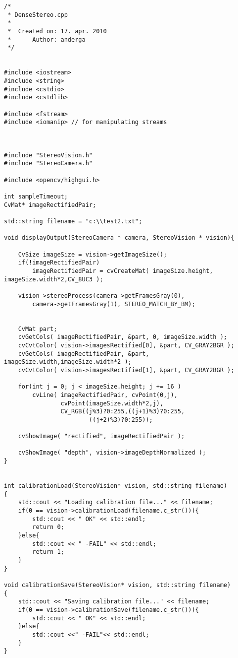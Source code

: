 \begin{lstlisting}
/*
 * DenseStereo.cpp
 *
 *  Created on: 17. apr. 2010
 *      Author: anderga
 */


#include <iostream>
#include <string>
#include <cstdio>
#include <cstdlib>

#include <fstream>
#include <iomanip> // for manipulating streams



#include "StereoVision.h"
#include "StereoCamera.h"

#include <opencv/highgui.h>

int sampleTimeout;
CvMat* imageRectifiedPair;

std::string filename = "c:\\test2.txt";

void displayOutput(StereoCamera * camera, StereoVision * vision){

    CvSize imageSize = vision->getImageSize();
    if(!imageRectifiedPair)
    	imageRectifiedPair = cvCreateMat( imageSize.height, imageSize.width*2,CV_8UC3 );

    vision->stereoProcess(camera->getFramesGray(0), 
        camera->getFramesGray(1), STEREO_MATCH_BY_BM);
    
    
    CvMat part;
    cvGetCols( imageRectifiedPair, &part, 0, imageSize.width );
    cvCvtColor( vision->imagesRectified[0], &part, CV_GRAY2BGR );
    cvGetCols( imageRectifiedPair, &part, imageSize.width,imageSize.width*2 );
    cvCvtColor( vision->imagesRectified[1], &part, CV_GRAY2BGR );

    for(int j = 0; j < imageSize.height; j += 16 )
    	cvLine( imageRectifiedPair, cvPoint(0,j),
    			cvPoint(imageSize.width*2,j),
    			CV_RGB((j%3)?0:255,((j+1)%3)?0:255,
    					((j+2)%3)?0:255));

    cvShowImage( "rectified", imageRectifiedPair );

    cvShowImage( "depth", vision->imageDepthNormalized );
}


int calibrationLoad(StereoVision* vision, std::string filename)
{
    std::cout << "Loading calibration file..." << filename;
    if(0 == vision->calibrationLoad(filename.c_str())){
        std::cout << " OK" << std::endl;
        return 0;
    }else{
        std::cout << " -FAIL" << std::endl;
        return 1;
    }
}

void calibrationSave(StereoVision* vision, std::string filename)
{
    std::cout << "Saving calibration file..." << filename;
    if(0 == vision->calibrationSave(filename.c_str())){
        std::cout << " OK" << std::endl;
    }else{
        std::cout <<" -FAIL"<< std::endl;
    }
}


\end{lstlisting}
